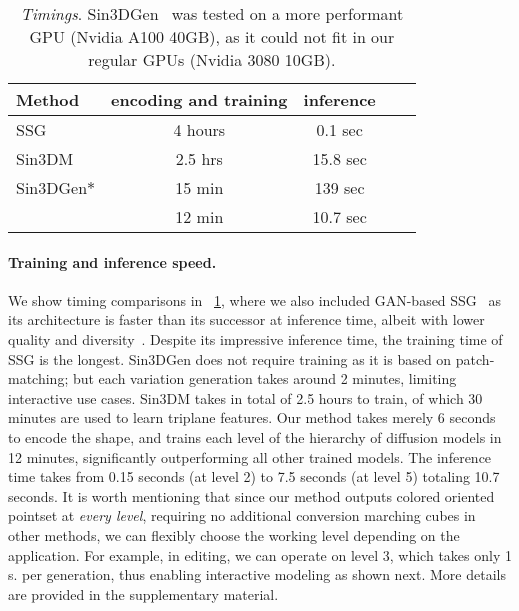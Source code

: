 \begin{table}[h] \vspace*{-1mm}
    \centering
    \begin{tabular}{lcccc}\toprule
       Method  & encoding and training & inference \\\midrule
       SSG &  4 hours & 0.1 sec \\
       Sin3DM  & 2.5 hrs & 15.8 sec \\
       Sin3DGen$\ast$ & 15 min & 139 sec \\
       \ourmethod{} & 12 min & 10.7 sec\\\bottomrule
    \end{tabular} \vspace*{-2mm}
    \caption{\emph{Timings}. Sin3DGen~\cite{li2023patch} was tested on a more performant GPU (Nvidia A100 40GB), as it could not fit in our regular GPUs (Nvidia 3080 10GB).\vspace*{-5mm}}
    \label{tab:timing}
\end{table}

\vspace*{-4mm}
\paragraph{Training and inference speed.}
We show timing comparisons in ~\cref{tab:timing}, where we also included GAN-based SSG~\cite{wu2022learning} as its architecture is faster than its successor at inference time, albeit with lower quality and diversity~\cite{wu2024sindm}. 
Despite its impressive inference time, the training time of SSG is the longest.
Sin3DGen does not require training as it is based on patch-matching; but each variation generation takes around 2 minutes, limiting interactive use cases.
Sin3DM takes in total of 2.5 hours to train, of which {\mytilde}30 minutes are used to learn triplane features.
Our method takes merely 6 seconds to encode the shape, and trains each level of the hierarchy of diffusion models in 12 minutes, significantly outperforming all other trained models. The inference time takes from 0.15 seconds (at level 2) to 7.5 seconds (at level 5) totaling 10.7 seconds.
It is worth mentioning that since our method outputs colored oriented pointset at \emph{every level}, requiring no additional conversion \eg marching cubes in other methods, we can flexibly choose the working level depending on the application. For example, in editing, we can operate on level 3, which takes only 1 s. per generation, thus enabling interactive modeling as shown next. More details are provided in the supplementary material.


